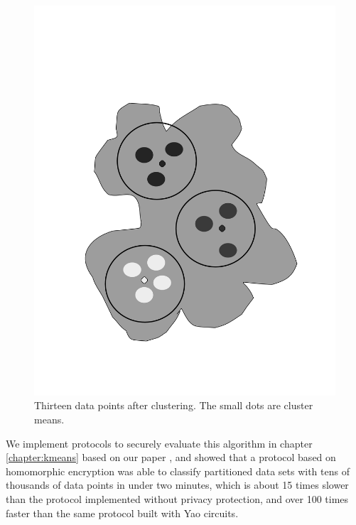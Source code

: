 %
\begin{figure}
\includegraphics[scale=0.3,angle=270]{chapters/clusters}

\caption{\label{fig:clusters}Thirteen data points after clustering. The small
dots are cluster means.}

\end{figure}


We implement protocols to securely evaluate this algorithm in chapter
\ref{chapter:kmeans} based on our paper \cite{kruger05}, and showed
that a protocol based on homomorphic encryption was able to classify
partitioned data sets with tens of thousands of data points in under
two minutes, which is about 15 times slower than the protocol implemented
without privacy protection, and over 100 times faster than the same
protocol built with Yao circuits.


